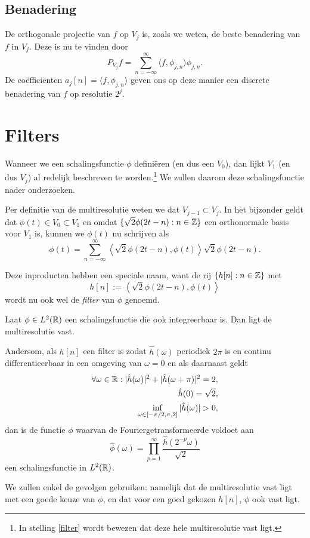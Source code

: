 \subsection{Benadering} De orthogonale projectie van $f$ op $V_j$ is, zoals we weten, de beste benadering van $f$ in $V_j$. Deze is nu te vinden door
\[
P_{V_j} f = \sum_{n=-\infty}^\infty \langle f, \phi_{j,n} \rangle \phi_{j,n}.
\]
De co\"effici\"enten $a_j[n] = \langle f, \phi_{j,n} \rangle$ geven ons op deze manier een discrete benadering van $f$ op resolutie $2^j$.

\section{Filters}
Wanneer we een schalingsfunctie $\phi$ defini\"eren (en dus een $V_0$), dan lijkt $V_1$ (en dus $V_j$) al redelijk beschreven te worden.\footnote{In stelling \ref{filter} wordt bewezen dat deze hele multiresolutie vast ligt.} We zullen daarom deze schalingsfunctie nader onderzoeken.

Per definitie van de multiresolutie weten we dat $V_{j-1} \subset V_j$. In het bijzonder geldt dat $\phi(t) \in V_0 \subset V_1$ en omdat $\{ \sqrt{2}\phi(2t - n): n \in \mathbb{Z}\}$ een orthonormale basis voor $V_1$ is, kunnen we $\phi(t)$ nu schrijven als
\[
\phi(t) = \sum_{n=-\infty}^{\infty} \left\langle \sqrt{2} \phi\left(2t-n\right), \phi(t) \right\rangle \sqrt{2}\phi(2t-n).
\]

\begin{definitie}
  Deze inproducten hebben een speciale naam, want de rij $\{h[n]: n \in \mathbb{Z}\}$ met
  \[
  h[n] := \left\langle \sqrt{2} \phi\left(2t-n\right), \phi(t) \right\rangle
  \]
  wordt nu ook wel de \emph{filter} van $\phi$ genoemd.
\end{definitie}
\begin{stelling}
  \label{filter}
  Laat $\phi \in L^2(\mathbb{R})$ een schalingsfunctie die ook integreerbaar is. Dan ligt de multiresolutie vast.

  Andersom, als $h[n]$ een filter is zodat $\hat{h}(\omega)$ periodiek $2\pi$ is en continu differentieerbaar in een omgeving van $\omega = 0$ en als daarnaast geldt
  \begin{align*}
    \forall \omega \in \mathbb{R}: | \hat{h}(\omega)|^2 + |\hat{h}(\omega + \pi)|^2 = 2, \\
    \hat{h}(0) = \sqrt{2}, \\
    \inf_{\omega \in [-\pi/2, \pi,2]} |\hat{h}(\omega)| > 0,
  \end{align*}
  dan is de functie $\phi$ waarvan de Fouriergetransformeerde voldoet aan
  \[
  \hat{\phi}(\omega) = \prod_{p=1}^\infty \frac{\hat{h}(2^{-p}\omega)}{\sqrt{2}}
  \]
  een schalingsfunctie in $L^2(\mathbb{R})$.
\end{stelling}
We zullen enkel de gevolgen gebruiken: namelijk dat de multiresolutie vast ligt met een goede keuze van $\phi$, en dat voor een goed gekozen $h[n]$, $\phi$ ook vast ligt.

